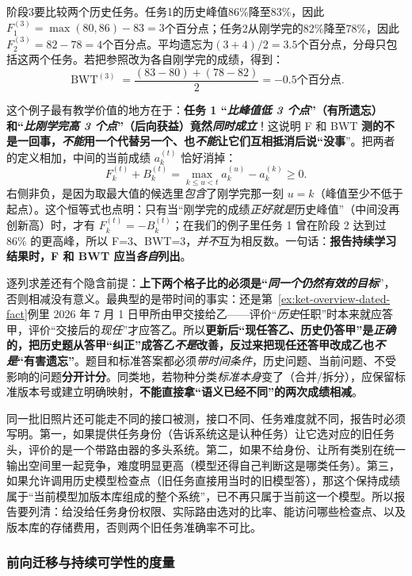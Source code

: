 \begin{samepage}
阶段3要比较两个历史任务。任务1的历史峰值86\%降至83\%，因此$F_1^{(3)}=\max(80,86)-83=3$个百分点；任务2从刚学完的82\%降至78\%，因此$F_2^{(3)}=82-78=4$个百分点。平均遗忘为$(3+4)/2=3.5$个百分点，分母只包括这两个任务。若把参照改为各自刚学完的成绩，得到：
\[
  \operatorname{BWT}^{(3)}
  =\frac{(83-80)+(78-82)}2
  =-0.5\text{个百分点}.
\]

\end{samepage}
这个例子最有教学价值的地方在于：\textbf{任务 1 “\emph{比峰值低 3 个点}”（有所遗忘）和“\emph{比刚学完高 3 个点}”（后向获益）竟然\emph{同时成立}}！这说明 F 和 BWT \textbf{测的不是一回事，\emph{不能}用一个代替另一个、也\emph{不能}让它们互相抵消后说“没事}”。把两者的定义相加，中间的当前成绩 $a_k^{(t)}$ 恰好消掉：
\[
  F_k^{(t)}+B_k^{(t)}
  =\max_{k\leq u<t}a_k^{(u)}-a_k^{(k)}\geq0.
\]
右侧非负，是因为取最大值的候选里\emph{包含}了刚学完那一刻 $u=k$（峰值至少不低于起点）。这个恒等式也点明：只有当“刚学完的成绩\emph{正好就是}历史峰值”（中间没再创新高）时，才有 $F_k^{(t)}=-B_k^{(t)}$；在我们的例子里任务 1 曾在阶段 2 达到过 86\% 的更高峰，所以 F=3、BWT=3，\emph{并不}互为相反数。一句话：\textbf{报告持续学习结果时，F 和 BWT 应当\emph{各自}列出}。

逐列求差还有个隐含前提：\textbf{上下两个格子比的必须是“\emph{同一个\emph{仍然有效}的目标}}”，否则相减没有意义。最典型的是带时间的事实：还是第~\ref{ex:ket-overview-dated-fact}例里 2026 年 7 月 1 日甲所由甲交接给乙——评价“\emph{历史}任职”时本来就应答甲，评价“交接后的\emph{现任}”才应答乙。所以\textbf{更新后“现任答乙、历史仍答甲”是\emph{正确}的，把历史题从答甲“纠正”成答乙\emph{不是}改善，反过来把现任还答甲改成乙\textbf{也\emph{不是}“有害遗忘}”}。题目和标准答案都必须\emph{带时间条件}，历史问题、当前问题、不受影响的问题\textbf{分开计分}。同类地，若物种分类\emph{标准本身}变了（合并/拆分），应保留标准版本号或建立明确映射，\textbf{不能直接拿“语义已经不同”的两次成绩相减}。

同一批旧照片还可能走不同的接口被测，接口不同、任务难度就不同，报告时必须写明。第一，如果提供任务身份（告诉系统这是认种任务）让它选对应的旧任务头，评价的是一个带路由器的多头系统。第二，如果不给身份、让所有类别在统一输出空间里一起竞争，难度明显更高（模型还得自己判断这是哪类任务）。第三，如果允许调用历史模型检查点（旧任务直接用当时的旧模型答），那这个保持成绩属于“当前模型加版本库组成的整个系统”，已不再只属于当前这一个模型。所以报告要列清：给没给任务身份权限、实际路由选对的比率、能访问哪些检查点、以及版本库的存储费用，否则两个旧任务准确率不可比。

\subsubsection{前向迁移与持续可学性的度量}
\label{sec:ket-evaluation-forward}

